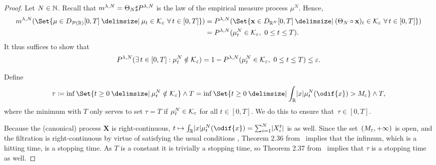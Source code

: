 \begin{proof}
  Let \( N \in \mathbb{N} \).
  Recall that \(m^{\lambda, N} = \Theta_N \sharp P^{\lambda, N}\) is the law of the empirical measure process \(\mu^N\).
  Hence,
  \begin{equation}
    \begin{split}
      \lawmu^{\lambda, N} ( \Set{ \mu \in D_{\cP(\potspace)}[0,T] \given \mu_t \in \cK_\eps\ \forall t \in [0,T] } )
       & = P^{\lambda, N}( \Set{ \bm{x} \in D_{\potspace^N}[0,T] \given (\Theta_N \circ \bm{x})_t \in \cK_\eps\ \forall t \in [0,T] } ) \\
       & = P^{\lambda, N} (\mu_t^N \in \cK_\eps,\ 0 \leq t \leq T).
    \end{split}
  \end{equation}
  It thus suffices to show that
  \begin{equation}
    P^{\lambda, N} (\exists t \in [0,T] : \mu_t^N \notin \cK_\eps) = 1 - P^{\lambda, N} (\mu_t^N \in \cK_\eps,\ 0 \leq t \leq T) \leq \eps.
  \end{equation}

  \medskip

  Define
  \begin{equation}
    \tau \coloneqq  \inf\Set{ t \geq 0 \given \mu_t^N \notin \cK_\eps } \land T
    = \inf\Set{ t \geq 0 \given \int_\potspace \abs{x} \mu_t^N(\odif{x}) > M_\eps } \land T,
  \end{equation}
  where the minimum with \( T \) only serves to set \( \tau = T \) if \( \mu_t^N \in \mathcal{K}_\varepsilon \) for all \( t \in [0, T] \).
  We do this to ensure that~\( \tau \in [0,T] \).

  Because the (canonical) process \( \bm{X} \) is right-continuous, \( t \mapsto \int_\potspace \abs{x} \mu_t^N(\odif{x}) = \sum_{i=1}^N \abs{X_i^t} \) is as well.
  Since the set~\( (M_\varepsilon, +\infty) \) is open, and the filtration is right-continuous by virtue of satisfying the usual conditions , Theorem 2.36 from~\cite{klebanerIntroductionStochasticCalculus2012} implies that the infimum, which is a hitting time, is a stopping time.
  As \( T \) is a constant it is trivially a stopping time, so Theorem 2.37 from~\cite{klebanerIntroductionStochasticCalculus2012} implies that \( \tau \) is a stopping time as well.


\end{proof}
